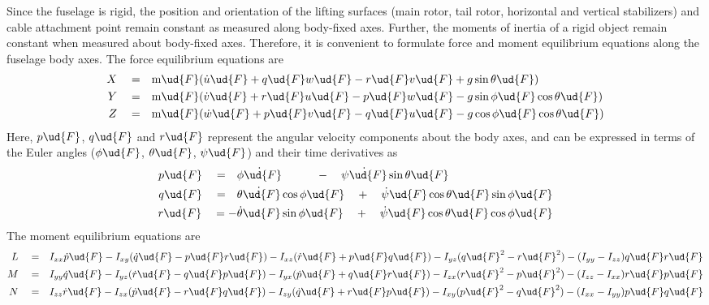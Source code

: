Since the fuselage is rigid, the position and orientation of the lifting surfaces (main rotor, tail rotor, horizontal and vertical stabilizers) and cable attachment point remain constant as measured along body-fixed axes. Further, the moments of inertia of a rigid object remain constant when measured about body-fixed axes. Therefore, it is convenient to formulate force and moment equilibrium equations along the fuselage body axes. The force equilibrium equations are 
\begin{align}
\label{eqn:bodyF1}
X \quad = \quad &\textrm{m}\ud{F} (\dot{u}\ud{F} + q\ud{F} w\ud{F} - r\ud{F} v\ud{F} + g \sin \theta\ud{F}) \\
\label{eqn:bodyF2}
Y \quad = \quad &\textrm{m}\ud{F} (\dot{v}\ud{F} + r\ud{F} u\ud{F} - p\ud{F} w\ud{F} - g \sin \phi\ud{F} \cos \theta\ud{F}) \\
\label{eqn:bodyF3}
Z \quad = \quad &\textrm{m}\ud{F} (\dot{w}\ud{F} + p\ud{F} v\ud{F} - q\ud{F} u\ud{F} - g \cos \phi\ud{F} \cos \theta\ud{F}) 
\end{align}
Here, $p\ud{F}$, $q\ud{F}$ and $r\ud{F}$ represent the angular velocity components about the body axes, and can be expressed in terms of the Euler angles ($\phi\ud{F}$, $\theta\ud{F}$, $\psi\ud{F}$) and their time derivatives as 
\begin{align}
\label{eqn:pqrf}
p\ud{F} \quad = \quad &\dot{\phi\ud{F}} \qquad \quad - \quad \dot{\psi\ud{F}} \sin \theta\ud{F} \\
q\ud{F} \quad = \quad &\dot{\theta\ud{F}} \cos \phi\ud{F} \quad + \quad \dot{\psi}\ud{F} \cos \theta\ud{F} \sin \phi\ud{F} \\
r\ud{F} \quad = -&\dot{\theta}\ud{F} \sin \phi\ud{F} \quad + \quad \dot{\psi}\ud{F} \cos \theta\ud{F} \cos \phi\ud{F} 
\end{align}
The moment equilibrium equations are
\begin{align}
\label{eqn:bodyM1}
L \quad = \quad &I_{xx} \dot{p}\ud{F} - I_{xy} (\dot{q}\ud{F} - p\ud{F} r\ud{F}) - I_{xz} (\dot{r}\ud{F} + p\ud{F} q\ud{F}) - I_{yz} (q\ud{F}^2 - r\ud{F}^2) - (I_{yy} - I_{zz}) q\ud{F} r\ud{F} \\
\label{eqn:bodyM2}
M \quad = \quad &I_{yy} \dot{q}\ud{F} - I_{yz} (\dot{r}\ud{F} - q\ud{F} p\ud{F}) - I_{yx} (\dot{p}\ud{F} + q\ud{F} r\ud{F}) - I_{zx} (r\ud{F}^2 - p\ud{F}^2) - (I_{zz} - I_{xx}) r\ud{F} p\ud{F} \\
\label{eqn:bodyM3}
N \quad = \quad &I_{zz} \dot{r}\ud{F} - I_{zx} (\dot{p}\ud{F} - r\ud{F} q\ud{F}) - I_{zy} (\dot{q}\ud{F} + r\ud{F} p\ud{F}) - I_{xy} (p\ud{F}^2 - q\ud{F}^2) - (I_{xx} - I_{yy}) p\ud{F} q\ud{F} 
\end{align}
